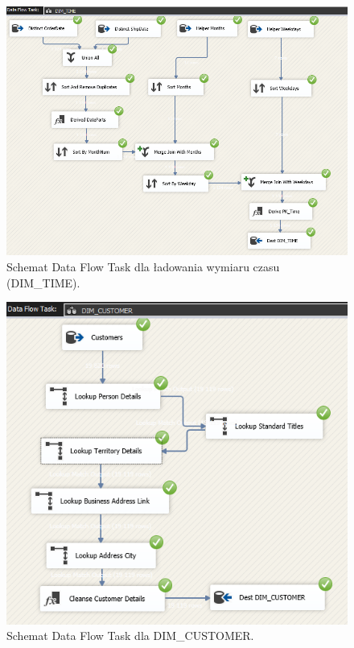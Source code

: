 \documentclass[a4paper,12pt]{article}
\begin{document}
\begin{figure}[H]
    \centering
    \includegraphics[width=\textwidth]{images/5_time.png}
    \caption{Schemat Data Flow Task dla ładowania wymiaru czasu (DIM\_TIME).}
    \label{fig:zad5_dft_dim_time}
\end{figure}

\begin{figure}[H]
    \centering
    \includegraphics[width=\textwidth]{images/5_customer.png}
    \caption{Schemat Data Flow Task dla DIM\_CUSTOMER.}
    \label{fig:zad5_dft_other_dim}
\end{figure}
\end{document}
